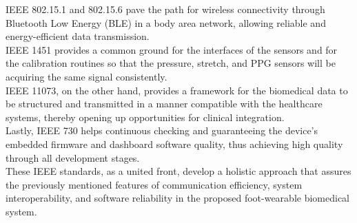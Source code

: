 \noindent IEEE 802.15.1 and 802.15.6 pave the path for wireless connectivity through Bluetooth Low Energy (BLE) in a body area network, allowing reliable and energy-efficient data transmission. \\

\noindent IEEE 1451 provides a common ground for the interfaces of the sensors and for the calibration routines so that the pressure, stretch, and PPG sensors will be acquiring the same signal consistently. \\

\noindent IEEE 11073, on the other hand, provides a framework for the biomedical data to be structured and transmitted in a manner compatible with the healthcare systems, thereby opening up opportunities for clinical integration. \\

\noindent Lastly, IEEE 730 helps continuous checking and guaranteeing the device's embedded firmware and dashboard software quality, thus achieving high quality through all development stages. \\

\noindent These IEEE standards, as a united front, develop a holistic approach that assures the previously mentioned features of communication efficiency, system interoperability, and software reliability in the proposed foot-wearable biomedical system.

